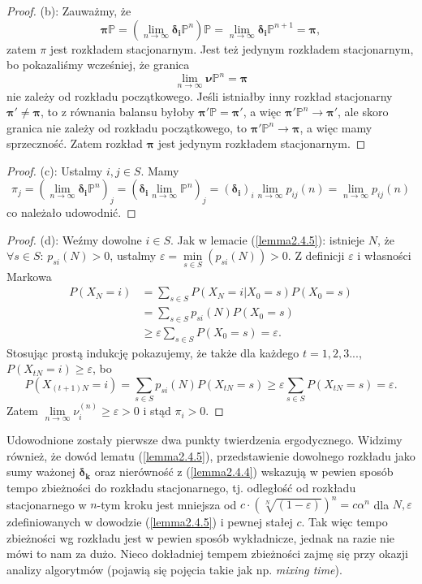 \documentclass[a4paper]{article}
\theoremstyle{defn}
\theoremstyle{theorem}
\theoremstyle{lemma}
\theoremstyle{cor}
\theoremstyle{fact}
\begin{document}
\begin{proof}
(b): Zauważmy, że $$\boldsymbol{\pi}\mathbb{P} = (\lim\limits_{n \to \infty} \boldsymbol{\delta_i}\mathbb{P}^n)\mathbb{P} = \lim\limits_{n \to \infty} \boldsymbol{\delta_i}\mathbb{P}^{n+1} = \boldsymbol{\pi},$$ zatem $\pi$ jest rozkładem stacjonarnym.
Jest też jedynym rozkładem stacjonarnym, bo pokazaliśmy wcześniej, że granica $$\lim\limits_{n \to \infty} \boldsymbol{\nu}\mathbb{P}^n = \boldsymbol{\pi}$$ nie zależy od rozkładu początkowego. Jeśli istniałby inny rozkład stacjonarny $\boldsymbol{\pi'} \neq \boldsymbol{\pi}$, to z równania balansu byłoby $\boldsymbol{\pi'}\mathbb{P} = \boldsymbol{\pi'}$, a więc $\boldsymbol{\pi'}\mathbb{P}^n \to \boldsymbol{\pi'}$, ale skoro granica nie zależy od rozkładu początkowego, to $\boldsymbol{\pi'}\mathbb{P}^n \to \boldsymbol{\pi}$, a więc mamy sprzeczność. Zatem rozkład $\boldsymbol{\pi}$ jest jedynym rozkładem stacjonarnym.
\end{proof}
\begin{proof}
(c): Ustalmy $i,j \in S$. Mamy $$\pi_j = (\lim\limits_{n \to \infty} \boldsymbol{\delta_i}\mathbb{P}^n)_j = (\boldsymbol{\delta_i} \lim\limits_{n \to \infty} \mathbb{P}^n)_j = (\boldsymbol{\delta_i})_i \lim\limits_{n \to \infty} p_{ij}(n) = \lim\limits_{n \to \infty} p_{ij}(n)$$ co należało udowodnić.
\end{proof}
\begin{proof}
(d): Weźmy dowolne $i \in S$. Jak w lemacie (\ref{lemma2.4.5}): istnieje $N$, że $\forall s \in S:\, p_{si}(N) > 0$, ustalmy $\varepsilon = \min\limits_{s \in S}(p_{si}(N)) > 0$. Z definicji $\varepsilon$ i własności Markowa 
\begin{align*}
P(X_N = i) &= \sum\limits_{s \in S} P(X_N = i|X_0 = s)P(X_0 = s) \\
&= \sum\limits_{s \in S} p_{si}(N)P(X_0 = s) \\
&\geq \varepsilon \sum\limits_{s \in S} P(X_0 = s) = \varepsilon.
\end{align*}
Stosując prostą indukcję pokazujemy, że także dla każdego $t = 1,2,3...$, $P(X_{tN} = i) \geq \varepsilon$, bo 
$$P(X_{(t+1)N} = i) = \sum\limits_{s \in S} p_{si}(N)P(X_{tN} = s) \geq \varepsilon \sum\limits_{s \in S} P(X_{tN} = s) = \varepsilon.$$
Zatem $\lim\limits_{n \to \infty} \nu_i^{(n)} \geq \varepsilon > 0$ i stąd $\pi_i > 0$.
\end{proof}
Udowodnione zostały pierwsze dwa punkty twierdzenia ergodycznego. Widzimy również, że dowód lematu (\ref{lemma2.4.5}), przedstawienie dowolnego rozkładu jako sumy ważonej $\boldsymbol{\delta_k}$ oraz nierówność z (\ref{lemma2.4.4}) wskazują w pewien sposób tempo zbieżności do rozkładu stacjonarnego, tj. odległość od rozkładu stacjonarnego w $n$-tym kroku jest mniejsza od $c \cdot (\sqrt[N]{(1-\varepsilon)})^n = c\alpha^n$ dla $N, \varepsilon$ zdefiniowanych w dowodzie (\ref{lemma2.4.5}) i pewnej stałej $c$. Tak więc tempo zbieżności wg rozkładu jest w pewien sposób wykładnicze, jednak na razie nie mówi to nam za dużo. Nieco dokładniej tempem zbieżności zajmę się przy okazji analizy algorytmów (pojawią się pojęcia takie jak np. \textit{mixing time}).
\\\\
\end{document}
